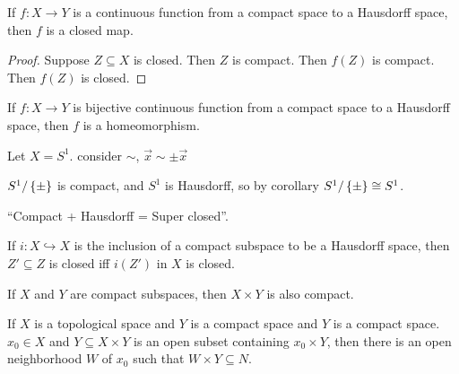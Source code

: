 \documentclass[12pt, twosided]{article}
\begin{document}
\begin{cor}
  If \(f:X \to Y\) is a continuous function from a compact space to a Hausdorff space, then \(f\) is a closed map.
\end{cor}

\begin{proof}
  Suppose \(Z \subseteq X\) is closed. Then \(Z\) is compact. Then \(f(Z)\) is compact. Then \(f(Z)\) is closed.
\end{proof}
\begin{cor}
  If \(f:X \to Y\) is bijective continuous function from a compact space to a Hausdorff space, then \(f\) is a homeomorphism.
\end{cor}

\begin{exa}
  Let \(X = S^1\). consider \(\sim\), \(\vec{x} \sim \pm \vec{x}\)

  \begin{center}
  \end{center}

  \(S^1/\left\{ \pm \right\}\) is compact, and \(S^1\) is Hausdorff, so by corollary \(S^1/\left\{ \pm \right\} \cong S^1\).
\end{exa}
\begin{framed}
  ``Compact + Hausdorff = Super closed''.

  If \(i: X \hookrightarrow X\) is the inclusion of a compact subspace to be a Hausdorff space, then \(Z\prime \subseteq Z\) is closed iff \(i(Z\prime)\) in \(X\) is closed.
\end{framed}
\begin{thm}
  If \(X\) and \(Y\) are compact subspaces, then \(X \times Y\) is also compact.
\end{thm}

\begin{lm}
  If \(X\) is a topological space and \(Y\) is a compact space and \(Y\) is a compact space. \(x_0 \in X\) and \(Y \subseteq X \times Y\) is an open subset containing \(x_0 \times Y\), then there is an open neighborhood \(W\) of \(x_0\) such that \(W \times Y \subseteq N\).
\end{lm}
\end{document}
